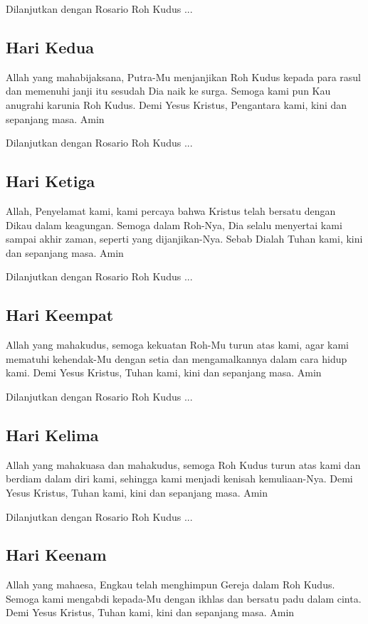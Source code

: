 Dilanjutkan dengan Rosario Roh Kudus ...

\subsection*{Hari Kedua}
Allah yang mahabijaksana, Putra-Mu menjanjikan Roh Kudus kepada para
rasul dan memenuhi janji itu sesudah Dia naik ke surga. Semoga kami pun
Kau anugrahi karunia Roh Kudus. Demi Yesus Kristus, Pengantara kami,
kini dan sepanjang masa. Amin

Dilanjutkan dengan Rosario Roh Kudus ...

\subsection*{Hari Ketiga}
Allah, Penyelamat kami, kami percaya bahwa Kristus telah bersatu dengan
Dikau dalam keagungan. Semoga dalam Roh-Nya, Dia selalu menyertai kami
sampai akhir zaman, seperti yang dijanjikan-Nya. Sebab Dialah Tuhan
kami, kini dan sepanjang masa. Amin

Dilanjutkan dengan Rosario Roh Kudus ...

\subsection*{Hari Keempat}
Allah yang mahakudus, semoga kekuatan Roh-Mu turun atas kami, agar kami
mematuhi kehendak-Mu dengan setia dan mengamalkannya dalam cara hidup
kami. Demi Yesus Kristus, Tuhan kami, kini dan sepanjang masa. Amin

Dilanjutkan dengan Rosario Roh Kudus ...

\subsection*{Hari Kelima}
Allah yang mahakuasa dan mahakudus, semoga Roh Kudus turun atas kami dan
berdiam dalam diri kami, sehingga kami menjadi kenisah kemuliaan-Nya.
Demi Yesus Kristus, Tuhan kami, kini dan sepanjang masa. Amin

Dilanjutkan dengan Rosario Roh Kudus ...

\subsection*{Hari Keenam}
Allah yang mahaesa, Engkau telah menghimpun Gereja dalam Roh Kudus.
Semoga kami mengabdi kepada-Mu dengan ikhlas dan bersatu padu dalam
cinta. Demi Yesus Kristus, Tuhan kami, kini dan sepanjang masa. Amin

